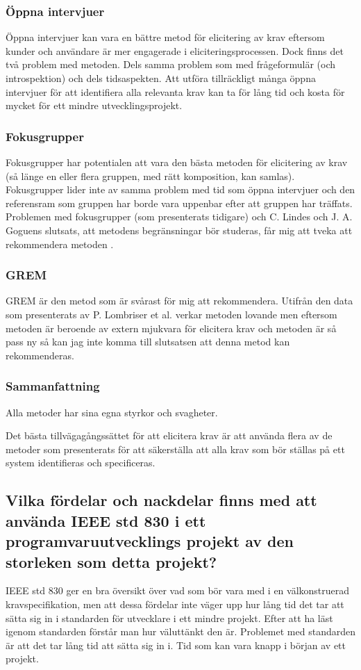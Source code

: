 \subsubsection{Öppna intervjuer}
Öppna intervjuer kan vara en bättre metod för elicitering av krav eftersom kunder och användare är mer engagerade i eliciteringsprocessen. Dock finns det två problem med metoden. Dels samma problem som med frågeformulär (och introspektion) och dels tidsaspekten. Att utföra tillräckligt många öppna intervjuer för att identifiera alla relevanta krav kan ta för lång tid och kosta för mycket för ett mindre utvecklingsprojekt.

\subsubsection{Fokusgrupper}
Fokusgrupper har potentialen att vara den bästa metoden för elicitering av krav (så länge en eller flera gruppen, med rätt komposition, kan samlas). Fokusgrupper lider inte av samma problem med tid som öppna intervjuer och den referensram som gruppen har borde vara uppenbar efter att gruppen har träffats. Problemen med fokusgrupper (som presenterats tidigare) och C. Lindes och J. A. Goguens slutsats, att metodens begränsningar bör studeras, får mig att tveka att rekommendera metoden \cite{goguen1993techniques}.

\subsubsection{GREM}
GREM är den metod som är svårast för mig att rekommendera. Utifrån den data som presenterats av P. Lombriser et al. \cite{lombriser2016gamified} verkar metoden lovande men eftersom metoden är beroende av extern mjukvara för elicitera krav och metoden är så pass ny så kan jag inte komma till slutsatsen att denna metod kan rekommenderas.

\subsubsection{Sammanfattning}
Alla metoder har sina egna styrkor och svagheter.

Det bästa tillvägagångssättet för att elicitera krav är att använda flera av de metoder som presenterats för att säkerställa att alla krav som bör ställas på ett system identifieras och specificeras.        

\subsection{Vilka fördelar och nackdelar finns med att använda IEEE std 830 i ett programvaruutvecklings projekt av den storleken som detta projekt?}
IEEE std 830 ger en bra översikt över vad som bör vara med i en välkonstruerad kravspecifikation, men att dessa fördelar inte väger upp hur lång tid det tar att sätta sig in i standarden för utvecklare i ett mindre projekt. Efter att ha läst igenom standarden förstår man hur väluttänkt den är. Problemet med standarden är att det tar lång tid att sätta sig in i. Tid som kan vara knapp i början av ett projekt. 
